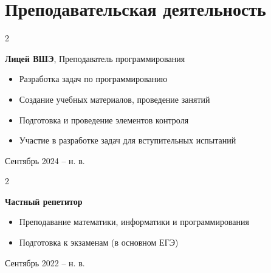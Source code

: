 \documentclass[a4paper,10pt]{article}
\newenvironment{highlights}{
    \begin{itemize}[
        topsep=0.10 cm,
        parsep=0.10 cm,
        partopsep=0pt,
        itemsep=0pt,
        leftmargin=0.4 cm + 10pt
    ]
}{
    \end{itemize}
} %
\newenvironment{twocolentry}[2][]{
    \onecolentry
    \def\secondColumn{#2}
    \setcolumnwidth{\fill, 4.5 cm}
    \begin{paracol}{2}
}{
    \switchcolumn \raggedleft \secondColumn
    \end{paracol}
    \endonecolentry
} %
\begin{document}
\section{Преподавательская деятельность}
    \begin{twocolentry}{Сентябрь 2024 – н. в.}
        \textbf{Лицей ВШЭ}, Преподаватель программирования
        \begin{highlights}
            \item Разработка задач по программированию
            \item Создание учебных материалов, проведение занятий
            \item Подготовка и проведение элементов контроля
            \item Участие в разработке задач для вступительных испытаний
        \end{highlights}
    \end{twocolentry}

    \begin{twocolentry}{Сентябрь 2022 – н. в.}
        \textbf{Частный репетитор}
        \begin{highlights}
            \item Преподавание математики, информатики и программирования
            \item Подготовка к экзаменам (в основном ЕГЭ)
        \end{highlights}
    \end{twocolentry}
\end{document}
